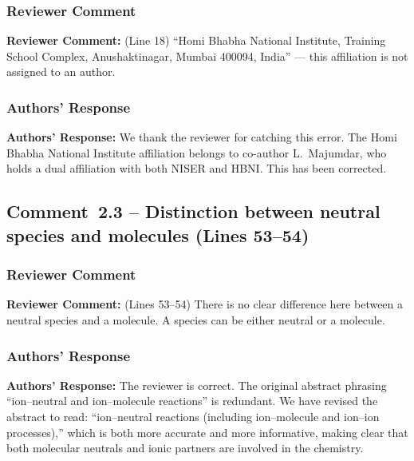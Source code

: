 \documentclass[12pt]{article}
\newcommand{\reviewlabel}{\textbf{\textcolor{commentframe}{Reviewer Comment:}}}
\newcommand{\responselabel}{\textbf{\textcolor{responseframe}{Authors' Response:}}}
\begin{document}
\subsubsection{Reviewer Comment}
\begin{reviewerbox}
\reviewlabel{} (Line 18) ``Homi Bhabha National Institute, Training School
Complex, Anushaktinagar, Mumbai 400094, India'' --- this affiliation is not
assigned to an author.
\end{reviewerbox}

\subsubsection{Authors' Response}
\begin{responsebox}
\responselabel{} We thank the reviewer for catching this error. The Homi
Bhabha National Institute affiliation belongs to co-author L.\ Majumdar, who
holds a dual affiliation with both NISER and HBNI. This has been corrected.
\end{responsebox}

\subsection{Comment~2.3 -- Distinction between neutral species and molecules (Lines 53--54)}

\subsubsection{Reviewer Comment}
\begin{reviewerbox}
\reviewlabel{} (Lines 53--54) There is no clear difference here between a
neutral species and a molecule. A species can be either neutral or a molecule.
\end{reviewerbox}

\subsubsection{Authors' Response}
\begin{responsebox}
\responselabel{} The reviewer is correct. The original abstract phrasing
``ion--neutral and ion--molecule reactions'' is redundant. We have revised the abstract to read: ``ion--neutral reactions (including ion--molecule and ion--ion processes),'' which is both more accurate and more informative, making clear that both molecular neutrals and ionic partners are involved in the chemistry.
\end{responsebox}
\end{document}
